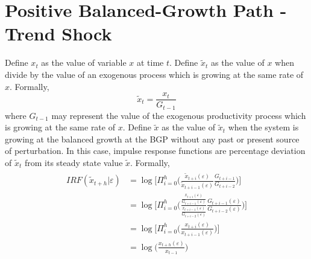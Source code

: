 \documentclass{article}
\begin{document}
\section{Positive Balanced-Growth Path - Trend Shock}

Define $x_t$ as the value of variable $x$ at time $t$. Define $\tilde{x}_t$ as the value of $x$ when divide by the value of an exogenous process which is growing at the same rate of $x$. Formally,
$$
\tilde{x}_t = \frac{x_t}{G_{t-1}}
$$
where $G_{t-1}$ may represent the value of the exogenous productivity process which is growing at the same rate of $x$. Define $\tilde{x}$ as the value of $\tilde{x}_t$ when the system is growing at the balanced growth at the BGP without any past or present source of perturbation. In this case, impulse response functions are percentage deviation of $\tilde{x}_t$ from its steady state value $\tilde{x}$. Formally,
\begin{eqnarray}
\begin{aligned}
IRF(\tilde{x}_{t+h} | \varepsilon) &= \log \bigg[ \Pi_{i=0}^h \bigg( \frac{\tilde{x}_{t+i}(\varepsilon)}{\tilde{x}_{t+i-1}(\varepsilon)}  \frac{G_{t+i-1}}{G_{t+i-2}}  \bigg) \bigg]  \\
&= \log \Bigg[ \Pi_{i=0}^h \Bigg( \frac{\frac{x_{t+i}(\varepsilon)}{G_{t+i-1}(\varepsilon)}}{\frac{x_{t+i-1}(\varepsilon)}{G_{t+i-2}(\varepsilon)}}  \frac{G_{t+i-1}(\varepsilon)}{G_{t+i-2}(\varepsilon)}  \Bigg) \Bigg]  \\
&= \log \Bigg[ \Pi_{i=0}^h \Bigg( \frac{x_{t+i}(\varepsilon)}{x_{t+i-1}(\varepsilon)}   \Bigg) \Bigg]  \\
&= \log \bigg( \frac{x_{t+h}(\varepsilon)}{x_{t-1}}  \bigg)  \\
\end{aligned}
\end{eqnarray}

	
\end{document}
